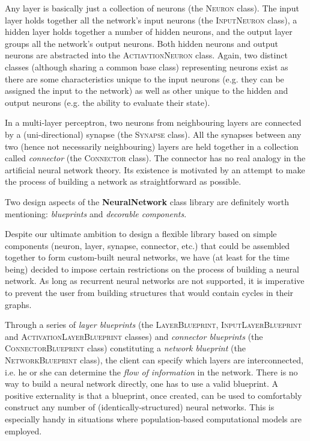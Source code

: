Any layer is basically just a collection of neurons (the \textsc{Neuron} class). The input layer holds together all the network's input neurons (the \textsc{InputNeuron} class), a hidden layer holds together a number of hidden neurons, and the output layer groups all the network's output neurons. Both hidden neurons and output neurons are abstracted into the \textsc{ActiavtionNeuron} class. Again, two distinct classes (although sharing a common base class) representing neurons exist as there are some characteristics unique to the input neurons (e.g. they can be assigned the input to the network) as well as other unique to the hidden and output neurons (e.g. the ability to evaluate their state).

In a multi-layer perceptron, two neurons from neighbouring layers are connected by a (uni-directional) synapse (the \textsc{Synapse} class). All the synapses between any two (hence not necessarily neighbouring) layers are held together in a collection called \textit{connector} (the \textsc{Connector} class). The connector has no real analogy in the artificial neural network theory. Its existence is motivated by an attempt to make the process of building a network as straightforward as possible.

Two design aspects of the \textbf{NeuralNetwork} class library are definitely worth mentioning: \textit{blueprints} and \textit{decorable components}.

Despite our ultimate ambition to design a flexible library based on simple components (neuron, layer, synapse, connector, etc.) that could be assembled together to form custom-built neural networks, we have (at least for the time being) decided to impose certain restrictions on the process of building a neural network. As long as recurrent neural networks are not supported, it is imperative to prevent the user from building structures that would contain cycles in their graphs.

Through a series of \textit{layer blueprints} (the \textsc{LayerBlueprint}, \textsc{InputLayerBlueprint} and \textsc{ActivationLayerBlueprint} classes) and \textit{connector blueprints} (the \textsc{ConnectorBlueprint} class) constituting a \textit{network blueprint} (the \textsc{NetworkBlueprint} class), the client can specify which layers are interconnected, i.e. he or she can determine the \textit{flow of information} in the network. There is no way to build a neural network directly, one has to use a valid blueprint. A positive externality is that a blueprint, once created, can be used to comfortably construct any number of (identically-structured) neural networks. This is especially handy in situations where population-based computational models are employed.

